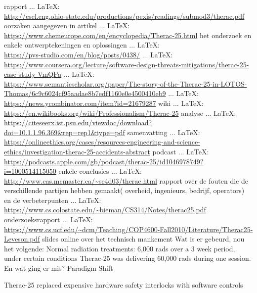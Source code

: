 \begin{thebibliography}{99}
rapport
 ... \LaTeX:\\ \url{http://csel.eng.ohio-state.edu/productions/pexis/readings/submod3/therac.pdf}
oorzaken aangegeven in artikel
 ... \LaTeX:\\ \url{https://www.chemeurope.com/en/encyclopedia/Therac-25.html}
het onderzoek en enkele ontwerptekeningen en oplossingen
 ... \LaTeX:\\ \url{https://pvs-studio.com/en/blog/posts/0438/}
 ... \LaTeX:\\ \url{https://www.coursera.org/lecture/software-design-threats-mitigations/therac-25-case-study-VmQPa}
 ... \LaTeX:\\ \url{https://www.semanticscholar.org/paper/The-story-of-the-Therac-25-in-LOTOS-Thomas/6c9c6024cf95aadae8b7edf1160e0e4500410eb9}
 ... \LaTeX:\\ \url{https://news.ycombinator.com/item?id=21679287}
wiki
 ... \LaTeX:\\ \url{https://en.wikibooks.org/wiki/Professionalism/Therac-25}
analyse
 ... \LaTeX:\\ \url{https://citeseerx.ist.psu.edu/viewdoc/download?doi=10.1.1.96.369&rep=rep1&type=pdf}
samenvatting
 ... \LaTeX:\\ \url{https://onlineethics.org/cases/resources-engineering-and-science-ethics/investigation-therac-25-accidents-abstract}
podcast
 ... \LaTeX:\\ \url{https://podcasts.apple.com/gb/podcast/therac-25/id1046978749?i=1000514115050}
enkele conclusies
 ... \LaTeX:\\ \url{http://www.cas.mcmaster.ca/~se4d03/therac.html}
rapport over de fouten die de verschillende partijen hebben gemaakt( overheid, ingenieurs, bedrijf, operators) en de verbeterpunten
 ... \LaTeX:\\ \url{https://www.cs.colostate.edu/~bieman/CS314/Notes/therac25.pdf}
onderzoeksrapport
 ... \LaTeX:\\ \url{https://www.cs.ucf.edu/~dcm/Teaching/COP4600-Fall2010/Literature/Therac25-Leveson.pdf}
slides online over het technisch mankement
Wat is er gebeurd, nou het volgende:
Normal radiation treatments: 6,000 rads over a 3 week period, under certain conditions Therac-25 was delivering 60,000 rads during one session.
En wat ging er mis?
Paradigm Shift

Therac-25 replaced expensive hardware safety interlocks with software controls


\end{thebibliography}

